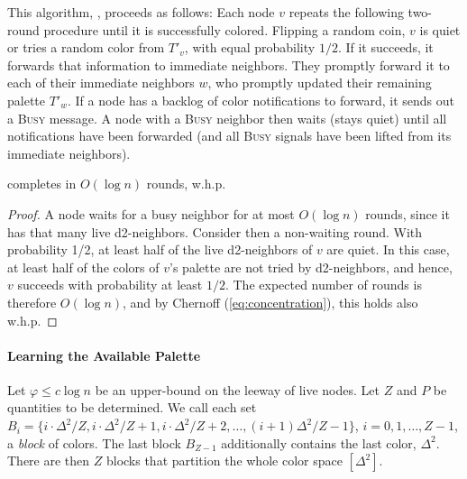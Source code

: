 This algorithm, , proceeds as follows:
Each node $v$ repeats the following two-round procedure until it is successfully colored. 
Flipping a random coin, $v$ is quiet or tries a random color from $T'_v$, with equal probability $1/2$.
If it succeeds, it forwards that information to immediate neighbors. They promptly forward it to each of their immediate neighbors $w$, who promptly updated their remaining palette $T'_w$. If a node has a backlog of color notifications to forward, it sends out a \textsc{Busy} message. A node with a \textsc{Busy} neighbor then waits (stays quiet) until all notifications have been forwarded (and all \textsc{Busy} signals have been lifted from its immediate neighbors). 

\begin{lemma}
 completes in $O(\log n)$ rounds, w.h.p.
\label{l:step7}
\end{lemma}

\begin{proof}
A node waits for a busy neighbor for at most $O(\log n)$ rounds, since it has that many live d2-neighbors.
Consider then a non-waiting round.
With probability 1/2, at least half of the live d2-neighbors of $v$ are quiet. In this case, at least half of the colors of $v$'s palette are not tried by d2-neighbors, and hence, $v$ succeeds with probability at least $1/2$. The expected number of rounds is therefore $O(\log n)$, and by Chernoff (\ref{eq:concentration}), this holds also w.h.p.
\end{proof}

\paragraph{Learning the Available Palette}
%
Let $\varphi \le c\log n$ be an upper-bound on the leeway of live nodes.
Let $Z$ and $P$ be quantities to be determined.
We call each set $B_i = \{i\cdot \Delta^2/Z, i\cdot \Delta^2/Z+1, i\cdot \Delta^2/Z+2, \ldots, (i+1)\Delta^2/Z-1 \}$, $i=0,1,\ldots, Z-1$, a \emph{block} of colors. The last block $B_{Z-1}$ additionally contains the last color, $\Delta^2$. 
There are then $Z$ blocks %
that partition the whole color space $[\Delta^2]$.

